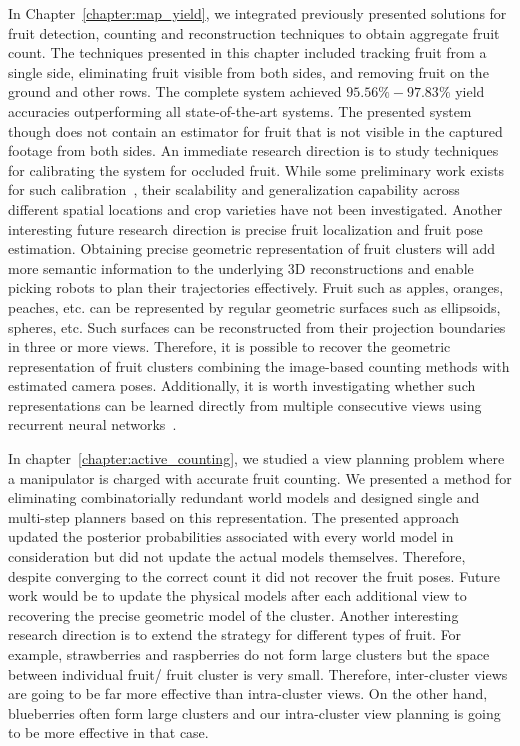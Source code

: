 In Chapter~\ref{chapter:map_yield}, we integrated previously presented solutions for fruit detection, counting and reconstruction techniques to obtain aggregate fruit count. The techniques presented in this chapter included tracking fruit from a single side, eliminating fruit visible from both sides, and removing fruit on the ground and other rows.  The complete system achieved $95.56\% -97.83\%$ yield accuracies outperforming all state-of-the-art systems. The presented system though does not contain an estimator for fruit that is not visible in the captured footage from both sides. An immediate research direction is to study techniques for calibrating the system for occluded fruit. While some preliminary work exists for such calibration~\cite{wang,bargoti_image_2017}, their scalability and generalization capability across different spatial locations and crop varieties have not been investigated. Another interesting future research direction is precise fruit localization and fruit pose estimation. Obtaining precise geometric representation of fruit clusters will add more semantic information to the underlying 3D reconstructions and enable picking robots to plan their trajectories effectively. Fruit such as apples, oranges, peaches, etc. can be represented by regular geometric surfaces such as ellipsoids, spheres, etc. Such surfaces can be reconstructed from their projection boundaries in three or more views. Therefore, it is possible to recover the geometric representation of fruit clusters combining the image-based counting methods with estimated camera poses. Additionally, it is worth investigating whether such representations can be learned directly from multiple consecutive views using recurrent neural networks~\cite{zaremba2014recurrent}.

In chapter~\ref{chapter:active_counting}, we studied a view planning problem where a manipulator is charged with accurate fruit counting. We presented a method for eliminating combinatorially redundant world models and designed single and multi-step planners based on this representation. The presented approach updated the posterior probabilities associated with every world model in consideration but did not update the actual models themselves. Therefore, despite converging to the correct count it did not recover the fruit poses. Future work would be to update the physical models after each additional view to recovering the precise geometric model of the cluster. Another interesting research direction is to extend the strategy for different types of fruit. For example, strawberries and raspberries do not form large clusters but the space between individual fruit/ fruit cluster is very small. Therefore, inter-cluster views are going to be far more effective than intra-cluster views. On the other hand, blueberries often form large clusters and our intra-cluster view planning is going to be more effective in that case.


